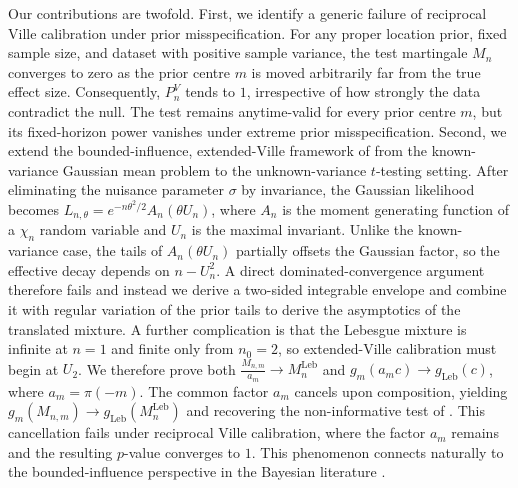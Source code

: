 \documentclass{article}
\begin{document}
Our contributions are twofold. First, we identify a generic failure of reciprocal Ville calibration under prior misspecification. For any proper location prior, fixed sample size, and dataset with positive sample variance, the test martingale \(M_{n}\) converges to zero as the prior centre \(m\) is moved arbitrarily far from the true effect size. Consequently, \(P_{n}^{V}\) tends to $1$, irrespective of how strongly the data contradict the null. The test remains anytime-valid for every prior centre \(m\), but its fixed-horizon power vanishes under extreme prior misspecification. Second, we %
extend the bounded-influence, extended-Ville framework of \citet{Cortinovis2025} from the known-variance Gaussian mean problem to the unknown-variance $t$-testing setting. After eliminating the nuisance parameter $\sigma$ by invariance, the Gaussian likelihood becomes $L_{n,\theta}=e^{-n\theta^2/2}A_n(\theta U_n)$, where $A_n$ is the moment generating function of a $\chi_n$ random variable and $U_n$ is the maximal invariant. Unlike the known-variance case, the tails of $A_n(\theta U_n)$ partially offsets the Gaussian factor, so the effective decay depends on $n-U_n^2$. A direct dominated-convergence argument therefore fails and instead we derive a two-sided integrable envelope and combine it with regular variation of the prior tails to derive the asymptotics of the translated mixture. A further complication is that the Lebesgue mixture is infinite at $n=1$ and finite only from $n_0=2$, so extended-Ville calibration must begin at $U_2$. We therefore prove both $\frac{M_{n,m}}{a_m}\longrightarrow M_n^{\mathrm{Leb}}$ and $g_m(a_m c)\longrightarrow g_{\mathrm{Leb}}(c)$, where $a_m = \pi(-m)$. The common factor $a_m$ cancels upon composition, yielding $g_m(M_{n,m})\longrightarrow g_{\mathrm{Leb}}(M_n^{\mathrm{Leb}})$ and recovering the non-informative test of \citet{Lai1976}. This cancellation fails under reciprocal Ville calibration, where the factor $a_m$ remains and the resulting $p$-value converges to $1$. This phenomenon connects naturally to the bounded-influence perspective in the Bayesian literature \citep{Dawid1973,Pericchi1992,Pericchi1995}.
\vspace{-4pt}
\end{document}
